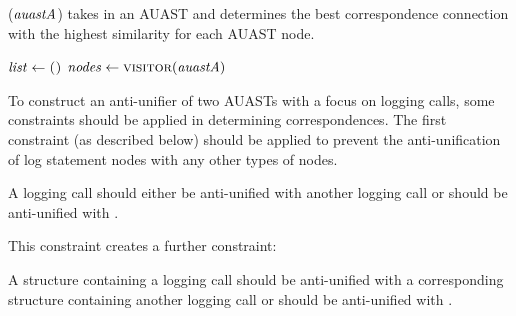 \begin{algorithm}
\caption{($\mathit{auastA}$) takes in an AUAST and determines the best correspondence connection with the highest similarity for each AUAST node.}
\label{alg-determine}
\begin{algorithmic}[1]
\DetermineBest
    \State $\mathit{list} \gets \textsc{()}$
    \State $\mathit{nodes} \gets \textsc{visitor}(\mathit{auastA})$
			 	\EndFor  	
	   \EndFor		
	   \EndFor
  \end{algorithmic}
\end{algorithm}

To construct an anti-unifier of two AUASTs with a focus on logging calls, some constraints should be applied in determining correspondences. The first constraint (as described below) should be applied to prevent the anti-unification of log statement nodes with any other types of nodes.
\begin{constraint}
A logging call should either be anti-unified with another logging call or should be anti-unified with \nothing.
\end{constraint}	
	
This constraint creates a further constraint:

\begin{constraint}
A structure containing a logging call should be anti-unified with a corresponding structure containing another logging call or should be anti-unified with \nothing.
\end{constraint}

